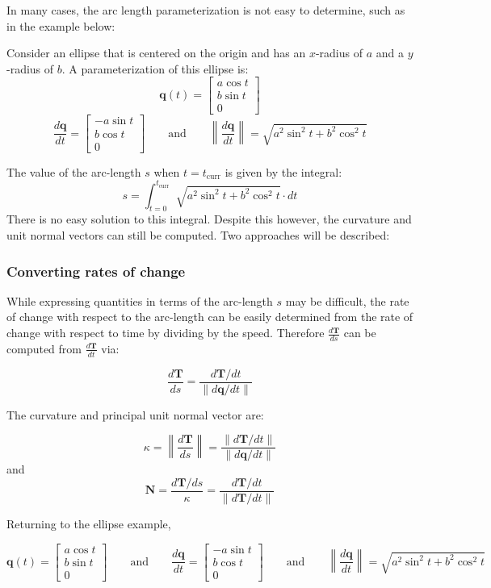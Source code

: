\documentclass{article}
\begin{document}
In many cases, the arc length parameterization is not easy to determine, such as in the example below: 

Consider an ellipse that is centered on the origin and has an \(x\)-radius of \(a\) and a \(y\)-radius of \(b\). A parameterization of this ellipse is:
\[\mathbf{q}(t) = \begin{bmatrix} a \cos t \\ b \sin t \\ 0 \end{bmatrix}\]  
\[\frac{d\mathbf{q}}{dt} = \begin{bmatrix} -a \sin t \\ b \cos t \\ 0 \end{bmatrix} \quad\quad\text{and}\quad\quad \left\|\frac{d\mathbf{q}}{dt}\right\| = \sqrt{a^2\sin^2 t + b^2 \cos^2 t}\] 

The value of the arc-length \(s\) when \(t = t_{\text{curr}}\) is given by the integral:
\[s = \int_{t = 0}^{t_{\text{curr}}} \sqrt{a^2\sin^2 t + b^2 \cos^2 t} \cdot dt\]
There is no easy solution to this integral. Despite this however, the curvature and unit normal vectors can still be computed. Two approaches will be described:




\subsubsection*{Converting rates of change}

While expressing quantities in terms of the arc-length \(s\) may be difficult, the rate of change with respect to the arc-length can be easily determined from the rate of change with respect to time by dividing by the speed. Therefore \(\frac{d\mathbf{T}}{ds}\) can be computed from \(\frac{d\mathbf{T}}{dt}\) via:

\[\frac{d\mathbf{T}}{ds} = \frac{d\mathbf{T}/dt}{\|d\mathbf{q}/dt\|}\]

The curvature and principal unit normal vector are:

\[\kappa = \left\|\frac{d\mathbf{T}}{ds}\right\| = \frac{\left\|d\mathbf{T}/dt\right\|}{\|d\mathbf{q}/dt\|}\] 
and
\[\mathbf{N} = \frac{d\mathbf{T}/ds}{\kappa} = \frac{d\mathbf{T}/dt}{\|d\mathbf{T}/dt\|}\]

Returning to the ellipse example, 

\[\mathbf{q}(t) = \begin{bmatrix} a \cos t \\ b \sin t \\ 0 \end{bmatrix} \quad\quad\text{and}\quad\quad \frac{d\mathbf{q}}{dt} = \begin{bmatrix} -a \sin t \\ b \cos t \\ 0 \end{bmatrix} \quad\quad\text{and}\quad\quad \left\|\frac{d\mathbf{q}}{dt}\right\| = \sqrt{a^2\sin^2 t + b^2 \cos^2 t}\]
\end{document}
